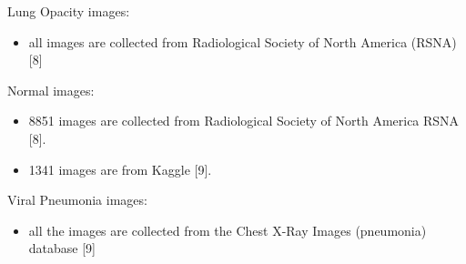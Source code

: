 \documentclass{article}
\begin{document}
Lung Opacity images:
\begin{itemize}
    \item all images are collected from Radiological Society of North America (RSNA) [8]
\end{itemize}

Normal images:
\begin{itemize}
    \item 8851 images are collected from Radiological Society of North America RSNA [8].
    \item 1341 images are from Kaggle [9].
\end{itemize}

Viral Pneumonia images:
\begin{itemize}
    \item all the images are collected from  the Chest X-Ray Images (pneumonia) database [9]
\end{itemize}
\end{document}
